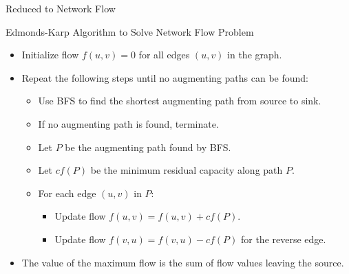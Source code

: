\documentclass{beamer}
\begin{document}
\begin{frame}{Reduced to Network Flow}
\begin{tikzpicture}
            
            

        \end{tikzpicture}
    
    
\end{frame}

\begin{frame}{Edmonds-Karp Algorithm to Solve Network Flow Problem}
        \begin{itemize}
        \item Initialize flow $f(u,v) = 0$ for all edges $(u,v)$ in the graph.
        \item Repeat the following steps until no augmenting paths can be found:
        \begin{itemize}
            \item Use BFS to find the shortest augmenting path from source to sink.
            \item If no augmenting path is found, terminate.
            \item Let $P$ be the augmenting path found by BFS.
            \item Let $cf(P)$ be the minimum residual capacity along path $P$.
            \item For each edge $(u,v)$ in $P$:
            \begin{itemize}
                \item Update flow $f(u,v) = f(u,v) + cf(P)$.
                \item Update flow $f(v,u) = f(v,u) - cf(P)$ for the reverse edge.
            \end{itemize}
        \end{itemize}
        \item The value of the maximum flow is the sum of flow values leaving the source.
    \end{itemize}

\end{frame}
\end{document}
